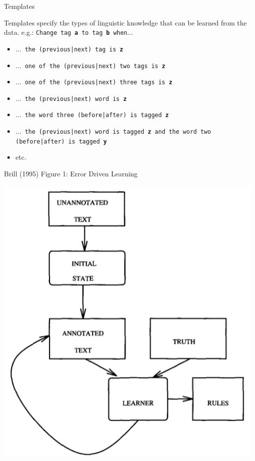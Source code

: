 \documentclass[9pt,xcolor=pdftex,dvipsnames,table]{beamer}
\begin{document}
\begin{frame}{Templates}

	{\large Templates specify the types of linguistic knowledge that can be learned from the data.  e.g.: \texttt{Change tag \textbf{a} to tag \textbf{b} when$\ldots$}}
	
	\begin{itemize}
		\item \texttt{$\ldots$ the (previous|next) tag is \textbf{z}}
		\item \texttt{$\ldots$ one of the (previous|next) two tags is \textbf{z}}
		\item \texttt{$\ldots$ one of the (previous|next) three tags is \textbf{z}}
		\item \texttt{$\ldots$ the (previous|next) word is \textbf{z}}
		\item \texttt{$\ldots$ the word three (before|after) is tagged \textbf{z}}
		\item \texttt{$\ldots$ the (previous|next) word is tagged \textbf{z} and the word two (before|after) is tagged \textbf{y}}
		\item etc.
	\end{itemize}
\end{frame}

\begin{frame}{Brill (1995) Figure 1: Error Driven Learning}

	\begin{center}
		\includegraphics[width=.5\paperwidth]{brill1}
	\end{center}
\end{frame}
\end{document}
